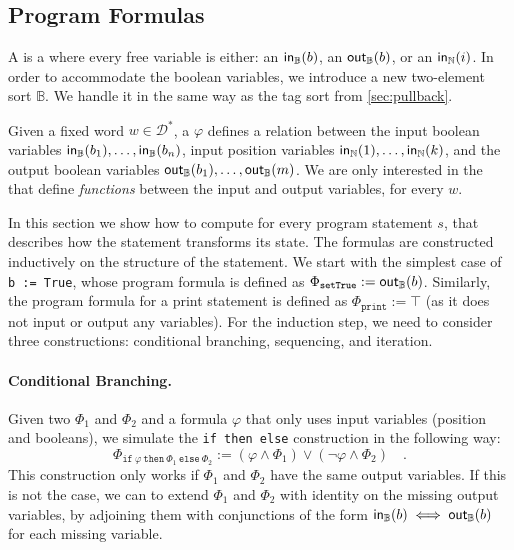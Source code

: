 \subsection{Program Formulas}
\label{sec:program-formulas}

\AP A  is a  where every
free variable is either: an 
$\mathsf{in}_{\mathbb{B}}(b)$, an  $\mathsf{out}_{\mathbb{B}}(b)$, or an
 $\mathsf{in}_{\mathbb{N}}(i)$. In order to accommodate the
boolean variables, we introduce a new two-element sort $\mathbb{B}$. 
We handle it in the same way as the tag sort from \cref{sec:pullback}.

Given a fixed word $w \in \mathcal{D}^*$, a 
$\varphi$ defines a relation between the input boolean variables
$\mathsf{in}_{\mathbb{B}}(b_1), \dots, \mathsf{in}_{\mathbb{B}}(b_n)$, input position variables
$\mathsf{in}_{\mathbb{N}}(1), \dots, \mathsf{in}_{\mathbb{N}}(k)$, and the output boolean variables
$\mathsf{out}_{\mathbb{B}}(b_1), \dots, \mathsf{out}_{\mathbb{B}}(m)$. We are only interested in the 
that define \emph{functions} between the input and output variables, 
for every $w$.

In this section we show how to compute  for every
program statement $s$, that describes how the statement transforms its state.
The formulas are constructed inductively on the structure of the statement.
We start with the simplest case of \texttt{b := True}, whose program 
formula is defined as $\Phi_{\texttt{setTrue}} := \mathsf{out}_{\mathbb{B}}(b)$.
Similarly, the program formula for a print statement is defined 
as $\Phi_{\texttt{print}} := \top$ (as it does not input or output any variables).
For the induction step, we need to consider three constructions: conditional
branching, sequencing, and iteration.

\paragraph{Conditional Branching.} 
Given two  $\Phi_1$ and $\Phi_2$
and a formula $\varphi$ that only uses input variables (position and booleans), 
we simulate the \texttt{if then else} construction in the following way:
\begin{equation*}
    \Phi_{\texttt{if}~\varphi~\texttt{then}~\Phi_1~\texttt{else}~\Phi_2} := (\varphi \land \Phi_1) \lor (\neg \varphi \land \Phi_2) \quad .
\end{equation*}
This construction only works if $\Phi_1$ and $\Phi_2$ have the same output variables. 
If this is not the case, we can to extend $\Phi_1$ and $\Phi_2$ with 
identity on the missing output variables, by adjoining them
with conjunctions of the form  $\mathsf{in}_{\mathbb{B}}(b) \iff \mathsf{out}_{\mathbb{B}}(b)$
for each missing variable. 

